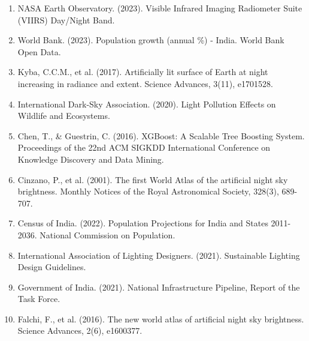 \documentclass[12pt,a4paper]{article}
\begin{document}
\begin{enumerate}
    \item NASA Earth Observatory. (2023). Visible Infrared Imaging Radiometer Suite (VIIRS) Day/Night Band.
    \item World Bank. (2023). Population growth (annual \%) - India. World Bank Open Data.
    \item Kyba, C.C.M., et al. (2017). Artificially lit surface of Earth at night increasing in radiance and extent. Science Advances, 3(11), e1701528.
    \item International Dark-Sky Association. (2020). Light Pollution Effects on Wildlife and Ecosystems.
    \item Chen, T., \& Guestrin, C. (2016). XGBoost: A Scalable Tree Boosting System. Proceedings of the 22nd ACM SIGKDD International Conference on Knowledge Discovery and Data Mining.
    \item Cinzano, P., et al. (2001). The first World Atlas of the artificial night sky brightness. Monthly Notices of the Royal Astronomical Society, 328(3), 689-707.
    \item Census of India. (2022). Population Projections for India and States 2011-2036. National Commission on Population.
    \item International Association of Lighting Designers. (2021). Sustainable Lighting Design Guidelines.
    \item Government of India. (2021). National Infrastructure Pipeline, Report of the Task Force.
    \item Falchi, F., et al. (2016). The new world atlas of artificial night sky brightness. Science Advances, 2(6), e1600377.
\end{enumerate}
\end{document}
